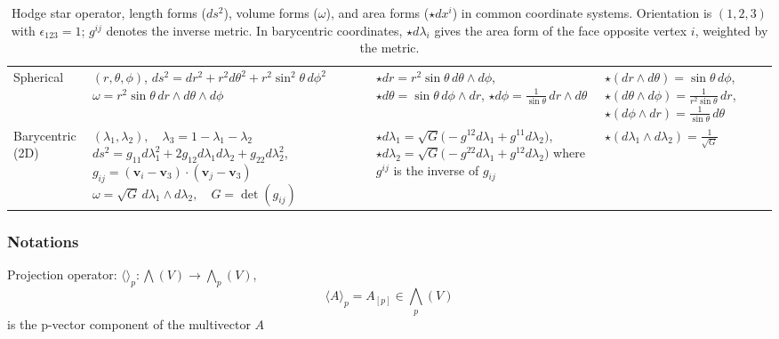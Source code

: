 \documentclass[12pt]{article}
\begin{document}
\begin{table}[!htbp]
\begin{tabular}{>{\raggedright\arraybackslash}p{2.7cm} 
			>{\raggedright\arraybackslash}p{5cm} 
			>{\raggedright\arraybackslash}p{6cm} 
			>{\raggedright\arraybackslash}p{5cm}}
		Spherical &
		\( (r,\theta,\phi) \), \quad \( ds^2 = dr^2 + r^2 d\theta^2 + r^2\sin^2\theta\, d\phi^2 \) \newline
		\( \omega = r^2 \sin\theta\, dr \wedge d\theta \wedge d\phi \) &
		\( \star dr = r^2\sin\theta\, d\theta \wedge d\phi \), \newline
		\( \star d\theta = \sin\theta\, d\phi \wedge dr \), \newline
		\( \star d\phi = \frac{1}{\sin\theta}\, dr \wedge d\theta \) &
		\( \star(dr \wedge d\theta) = \sin\theta\, d\phi \), \newline
		\( \star(d\theta \wedge d\phi) = \frac{1}{r^2\sin\theta}\, dr \), \newline
		\( \star(d\phi \wedge dr) = \frac{1}{\sin\theta}\, d\theta \) \\
		\addlinespace
		
		Barycentric (2D) &
		\( (\lambda_1,\lambda_2),\quad \lambda_3 = 1-\lambda_1-\lambda_2 \) \newline
		\( ds^2 = g_{11}d\lambda_1^2 + 2g_{12}d\lambda_1d\lambda_2 + g_{22}d\lambda_2^2 \), \newline
		\( g_{ij} = (\mathbf{v}_i-\mathbf{v}_3)\cdot(\mathbf{v}_j-\mathbf{v}_3) \) \newline
		\( \omega = \sqrt{G}\, d\lambda_1\wedge d\lambda_2, \quad G = \det(g_{ij}) \) &
		\( \star d\lambda_1 = \sqrt{G}\bigl( -g^{12}d\lambda_1 + g^{11}d\lambda_2 \bigr) \), \newline
		\( \star d\lambda_2 = \sqrt{G}\bigl( -g^{22}d\lambda_1 + g^{12}d\lambda_2 \bigr) \) \newline
		where \( g^{ij} \) is the inverse of \( g_{ij} \) &
		\( \star(d\lambda_1\wedge d\lambda_2) = \frac{1}{\sqrt{G}} \) \\
		\bottomrule
	\end{tabular}
	\caption{Hodge star operator, length forms ($ds^2$), volume forms ($\omega$), and area forms ($\star dx^i$) in common coordinate systems. Orientation is $(1,2,3)$ with $\epsilon_{123}=1$; $g^{ij}$ denotes the inverse metric. In barycentric coordinates, $\star d\lambda_i$ gives the area form of the face opposite vertex $i$, weighted by the metric.}
	\label{tab:hodge}
\end{table}

\newpage

\subsubsection{Notations}
Projection operator: $\langle \rangle_p: \bigwedge(V) \to \bigwedge_p(V)$,  $$\langle A\rangle_p = A_{[p]} \in \bigwedge_p(V)$$ is the p-vector component of the multivector $A$
\end{document}
